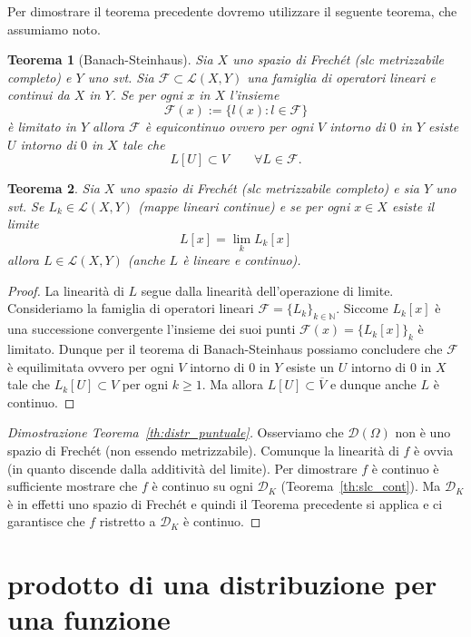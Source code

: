 \documentclass[italian,a4paper,oneside,headinclude]{scrbook}
\newcommand{\D}{\mathcal D}
\newcommand{\F}{\mathcal F}
\renewcommand{\L}{\mathcal L}
\newcommand{\NN}{\mathbb N}
\newcommand{\defeq}{:=}
\newtheorem{theorem}{Teorema}
\begin{document}
Per dimostrare il teorema precedente dovremo utilizzare il seguente
teorema, che assumiamo noto.

\begin{theorem}[Banach-Steinhaus]\label{th:BanachSteinhaus}
  \cite[2.6]{Rudin}
  Sia $X$ uno spazio di Frechét (slc metrizzabile completo) e $Y$ uno svt.
  Sia $\F\subset \L(X,Y)$ una famiglia di operatori
  lineari e continui da $X$ in $Y$. Se per ogni $x$ in $X$ l'insieme
  \[
  \F(x) \defeq \{ l(x) \colon l \in \F\}
  \]
  è limitato in $Y$ allora $\F$ è equicontinuo ovvero per ogni $V$
  intorno di $0$ in $Y$ esiste $U$ intorno di $0$ in $X$ tale che
  \[
    L[U] \subset V \qquad \forall L \in \F.
  \]
\end{theorem}
%
\begin{theorem}
  \cite[2.8]{Rudin}
  Sia $X$ uno spazio di Frechét (slc metrizzabile completo) e sia $Y$ uno svt.
  Se $L_k\in \L(X,Y)$ (mappe lineari continue)
  e se per ogni $x\in X$ esiste il limite
  \[
  L[x] = \lim_k L_k[x]
  \]
  allora $L\in \L(X,Y)$ (anche $L$ è lineare e continuo).
\end{theorem}
%
\begin{proof}
  La linearità di $L$ segue dalla linearità dell'operazione di limite.
  Consideriamo la famiglia di operatori lineari
  $\F=\{L_k\}_{k\in \NN}$. Siccome $L_k[x]$ è una
  successione convergente l'insieme dei suoi punti
  $\F(x)=\{L_k[x]\}_k$ è limitato. Dunque per il teorema di
  Banach-Steinhaus possiamo concludere che $\F$ è equilimitata ovvero
  per ogni $V$ intorno di $0$ in $Y$ esiste un $U$ intorno di $0$ in
  $X$ tale che $L_k[U]\subset V$ per ogni $k\ge 1$. Ma allora
  $L[U]\subset \overline{V}$ e dunque anche $L$ è continuo.
\end{proof}
%
\begin{proof}[Dimostrazione Teorema~\ref{th:distr_puntuale}]
  Osserviamo che $\D(\Omega)$ non è uno spazio di Frechét (non essendo
  metrizzabile). Comunque la linearità di $f$ è ovvia (in quanto
  discende dalla additività del limite).
  Per dimostrare $f$ è continuo è sufficiente mostrare che $f$ è
  continuo su ogni $\D_K$ (Teorema~\ref{th:slc_cont}). Ma $\D_K$ è in
  effetti uno spazio di Frechét e quindi il Teorema precedente si
  applica e ci garantisce
  che $f$ ristretto a $\D_K$ è continuo.
\end{proof}


\section{prodotto di una distribuzione per una funzione}
\end{document}
